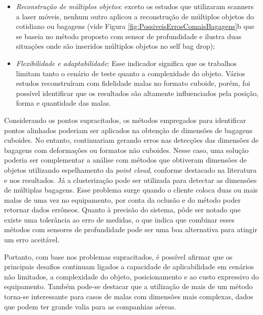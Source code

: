     \begin{itemize}
        \item \textit{Reconstrução de múltiplos objetos}: exceto os estudos que utilizaram scanners a laser móveis, nenhum outro aplicou a reconstrução de múltiplos objetos do cotidiano ou bagagens (vide Figura \ref{fig:PossiveisErrosComaisBagagens}b que se baseia no método proposto com sensor de profundidade e ilustra duas situações onde são inseridos múltiplos objetos no self bag drop); 
        \item \textit{Flexibilidade e adaptabilidade}: Esse indicador significa que os trabalhos limitam tanto o cenário de teste quanto a complexidade do objeto. Vários estudos reconstruíram com fidelidade malas no formato cuboide, porém, foi possível identificar que os resultados são altamente influenciados pela posição, forma e quantidade das malas.
    \end{itemize}

    Considerando os pontos supracitados, os métodos empregados para identificar pontos alinhados poderiam ser aplicados na obtenção de dimensões de bagagens cuboides. No entanto, continuariam gerando erros nas detecções das dimensões de bagagens com deformações ou formatos não cuboides. Nesse caso, uma solução poderia ser complementar a análise com métodos que obtiveram dimensões de objetos utilizando espelhamento da \textit{point cloud}, conforme destacado na literatura e nos resultados. Já a clusterização pode ser utilizada para detectar as dimensões de múltiplas bagagens. Esse problema surge quando o cliente coloca duas ou mais malas de uma vez no equipamento, por conta da oclusão e do método poder retornar dados errôneos. Quanto à precisão do sistema, pôde ser notado que existe uma tolerância ao erro de medidas, o que indica que combinar esses métodos com sensores de profundidade pode ser uma boa alternativa para atingir um erro aceitável.
    
    Portanto, com base nos problemas supracitados, é possível afirmar que os principais desafios continuam ligados a capacidade de aplicabilidade em cenários não limitados, a complexidade do objeto, posicionamento e ao custo expressivo do equipamento. Também pode-se destacar que a utilização de mais de um método torna-se interessante para casos de malas com dimensões mais complexas, dados que podem ter grande valia para as companhias aéreas.

